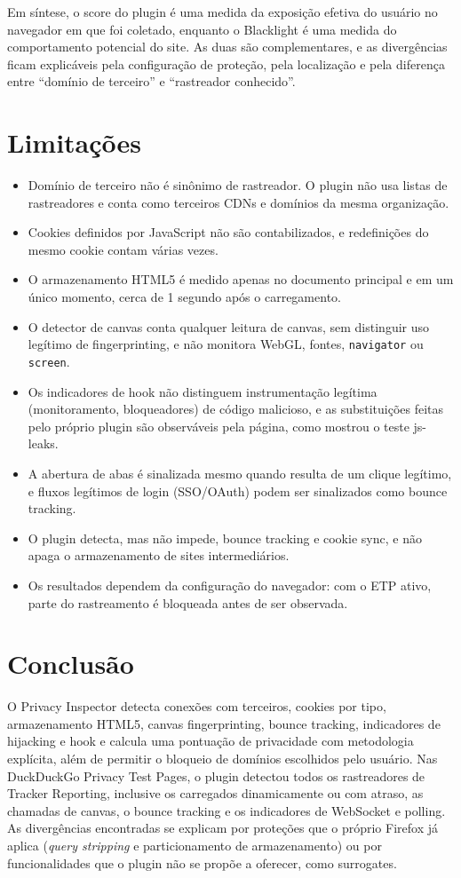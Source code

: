 \documentclass[11pt,a4paper]{article}
\begin{document}
Em síntese, o score do plugin é uma medida da exposição efetiva do usuário no navegador em que foi coletado, enquanto o Blacklight é uma medida do comportamento potencial do site. As duas são complementares, e as divergências ficam explicáveis pela configuração de proteção, pela localização e pela diferença entre ``domínio de terceiro'' e ``rastreador conhecido''.

\section{Limitações}

\begin{itemize}
  \item Domínio de terceiro não é sinônimo de rastreador. O plugin não usa listas de rastreadores e conta como terceiros CDNs e domínios da mesma organização.
  \item Cookies definidos por JavaScript não são contabilizados, e redefinições do mesmo cookie contam várias vezes.
  \item O armazenamento HTML5 é medido apenas no documento principal e em um único momento, cerca de 1 segundo após o carregamento.
  \item O detector de canvas conta qualquer leitura de canvas, sem distinguir uso legítimo de fingerprinting, e não monitora WebGL, fontes, \texttt{navigator} ou \texttt{screen}.
  \item Os indicadores de hook não distinguem instrumentação legítima (monitoramento, bloqueadores) de código malicioso, e as substituições feitas pelo próprio plugin são observáveis pela página, como mostrou o teste js-leaks.
  \item A abertura de abas é sinalizada mesmo quando resulta de um clique legítimo, e fluxos legítimos de login (SSO/OAuth) podem ser sinalizados como bounce tracking.
  \item O plugin detecta, mas não impede, bounce tracking e cookie sync, e não apaga o armazenamento de sites intermediários.
  \item Os resultados dependem da configuração do navegador: com o ETP ativo, parte do rastreamento é bloqueada antes de ser observada.
\end{itemize}

\section{Conclusão}

O Privacy Inspector detecta conexões com terceiros, cookies por tipo, armazenamento HTML5, canvas fingerprinting, bounce tracking, indicadores de hijacking e hook e calcula uma pontuação de privacidade com metodologia explícita, além de permitir o bloqueio de domínios escolhidos pelo usuário. Nas DuckDuckGo Privacy Test Pages, o plugin detectou todos os rastreadores de Tracker Reporting, inclusive os carregados dinamicamente ou com atraso, as chamadas de canvas, o bounce tracking e os indicadores de WebSocket e polling. As divergências encontradas se explicam por proteções que o próprio Firefox já aplica (\emph{query stripping} e particionamento de armazenamento) ou por funcionalidades que o plugin não se propõe a oferecer, como surrogates.
\end{document}

